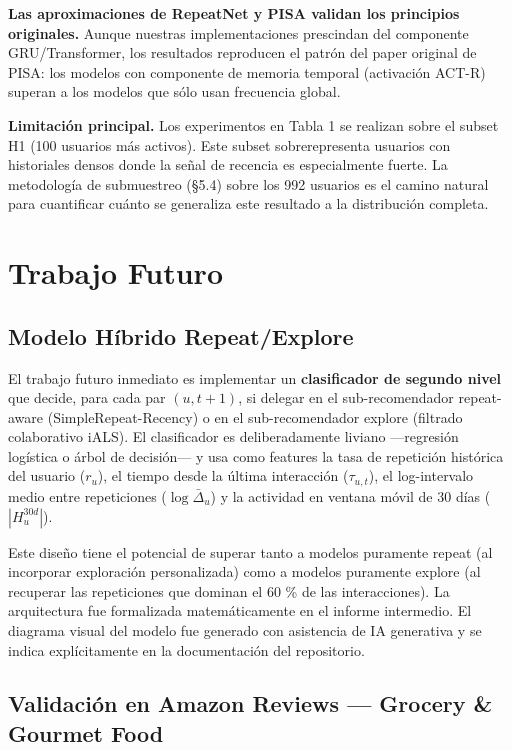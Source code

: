 \documentclass{article}
\begin{document}
\textbf{Las aproximaciones de RepeatNet y PISA validan los principios originales.} Aunque nuestras implementaciones prescindan del componente GRU/Transformer, los resultados reproducen el patrón del paper original de PISA: los modelos con componente de memoria temporal (activación ACT-R) superan a los modelos que sólo usan frecuencia global.

\textbf{Limitación principal.} Los experimentos en Tabla 1 se realizan sobre el subset H1 (100 usuarios más activos). Este subset sobrerepresenta usuarios con historiales densos donde la señal de recencia es especialmente fuerte. La metodología de submuestreo (§5.4) sobre los 992 usuarios es el camino natural para cuantificar cuánto se generaliza este resultado a la distribución completa.

\section{Trabajo Futuro}\label{trabajo-futuro}

\subsection{Modelo Híbrido Repeat/Explore}\label{modelo-huxedbrido-repeatexplore}

El trabajo futuro inmediato es implementar un \textbf{clasificador de segundo nivel} que decide, para cada par \((u, t+1)\), si delegar en el sub-recomendador repeat-aware (SimpleRepeat-Recency) o en el sub-recomendador explore (filtrado colaborativo iALS). El clasificador es deliberadamente liviano ---regresión logística o árbol de decisión--- y usa como features la tasa de repetición histórica del usuario (\(r_u\)), el tiempo desde la última interacción (\(\tau_{u,t}\)), el log-intervalo medio entre repeticiones (\(\log \bar{\Delta}_u\)) y la actividad en ventana móvil de 30 días (\(|H_u^{30d}|\)).

Este diseño tiene el potencial de superar tanto a modelos puramente repeat (al incorporar exploración personalizada) como a modelos puramente explore (al recuperar las repeticiones que dominan el 60 \% de las interacciones). La arquitectura fue formalizada matemáticamente en el informe intermedio. El diagrama visual del modelo fue generado con asistencia de IA generativa y se indica explícitamente en la documentación del repositorio.

\subsection{Validación en Amazon Reviews --- Grocery \& Gourmet Food}\label{validaciuxf3n-en-amazon-reviews-grocery-gourmet-food}
\end{document}
